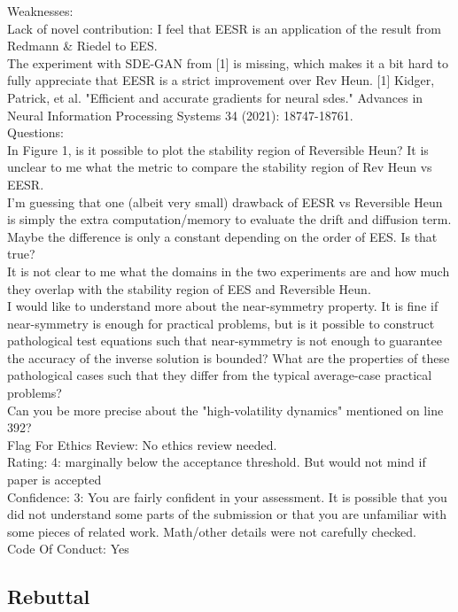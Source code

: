 \documentclass{article}
\begin{document}
Weaknesses:\\
Lack of novel contribution: I feel that EESR is an application of the result from Redmann \& Riedel to EES.\\
The experiment with SDE-GAN from [1] is missing, which makes it a bit hard to fully appreciate that EESR is a strict improvement over Rev Heun. [1] Kidger, Patrick, et al. "Efficient and accurate gradients for neural sdes." Advances in Neural Information Processing Systems 34 (2021): 18747-18761.\\

Questions:\\
In Figure 1, is it possible to plot the stability region of Reversible Heun? It is unclear to me what the metric to compare the stability region of Rev Heun vs EESR.\\
I'm guessing that one (albeit very small) drawback of EESR vs Reversible Heun is simply the extra computation/memory to evaluate the drift and diffusion term. Maybe the difference is only a constant depending on the order of EES. Is that true?\\
It is not clear to me what the domains in the two experiments are and how much they overlap with the stability region of EES and Reversible Heun.\\
I would like to understand more about the near-symmetry property. It is fine if near-symmetry is enough for practical problems, but is it possible to construct pathological test equations such that near-symmetry is not enough to guarantee the accuracy of the inverse solution is bounded? What are the properties of these pathological cases such that they differ from the typical average-case practical problems?\\
Can you be more precise about the "high-volatility dynamics" mentioned on line 392?\\
Flag For Ethics Review: No ethics review needed.\\
Rating: 4: marginally below the acceptance threshold. But would not mind if paper is accepted\\
Confidence: 3: You are fairly confident in your assessment. It is possible that you did not understand some parts of the submission or that you are unfamiliar with some pieces of related work. Math/other details were not carefully checked.\\
Code Of Conduct: Yes\\

\subsection{Rebuttal}
\end{document}
